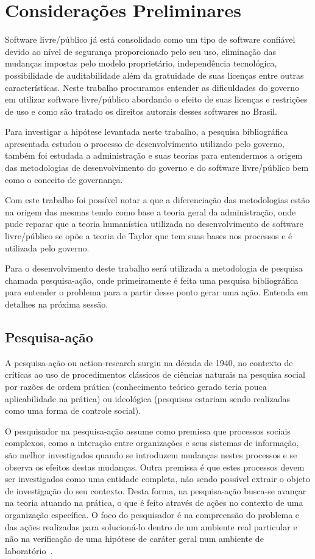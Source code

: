 \chapter{Considerações Preliminares}
\label{consideracoes}

Software livre/público já está consolidado como um tipo de software confiável 
devido ao nível de segurança proporcionado pelo seu uso, eliminação das mudanças
impostas pelo modelo proprietário, independência tecnológica, possibilidade de
auditabilidade além da gratuidade de suas licenças entre outras características.
%
Neste trabalho procuramos entender as dificuldades do governo em utilizar software
livre/público abordando o efeito de suas licenças e restrições de uso e como são 
tratado os direitos autorais desses softwares no Brasil.

Para investigar a hipótese levantada neste trabalho, a pesquisa bibliográfica 
apresentada estudou o processo de desenvolvimento utilizado pelo governo, também foi 
estudada a administração e suas teorias para entendermos a origem das metodologias
de desenvolvimento do governo e do software livre/público bem como o conceito de 
governança.

Com este trabalho foi possível notar a que a diferenciação das metodologias estão
na origem das mesmas tendo como base a teoria geral da administração, onde pude reparar
que a teoria humanística utilizada no desenvolvimento de software livre/público se
opõe a teoria de Taylor que tem suas bases nos processos e é utilizada pelo governo.

Para o desenvolvimento deste trabalho será utilizada a metodologia de pesquisa chamada
pesquisa-ação, onde primeiramente é feita uma pesquisa bibliográfica para entender
o problema para a partir desse ponto gerar uma ação. Entenda em detalhes na próxima sessão.

\section{Pesquisa-ação}

A pesquisa-ação ou action-research surgiu na década de 1940, no contexto de críticas ao uso
de procedimentos clássicos de ciências naturais na pesquisa social por razões de ordem prática 
(conhecimento teórico gerado teria pouca aplicabilidade na prática) ou ideológica (pesquisas estariam
sendo realizadas como uma forma de controle social)\cite{gil2010metodos}.

O pesquisador na pesquisa-ação
assume como premissa que processos sociais complexos, como a interação
entre organizações e seus sistemas de informação, são melhor investigados
quando se introduzem mudanças nestes processos e se observa os efeitos
destas mudanças. Outra premissa é que estes processos devem ser
investigados como uma entidade completa, não sendo possível extrair o objeto
de investigação do seu contexto. Desta forma, na pesquisa-ação busca-se avançar na teoria 
atuando na prática, o que é feito através de
ações no contexto de uma organização específica. O foco do pesquisador é na
compreensão do problema e das ações realizadas para solucioná-lo dentro de
um ambiente real particular e não na verificação de uma hipótese de caráter
geral num ambiente de laboratório~\cite{fuks2008suporte}.

